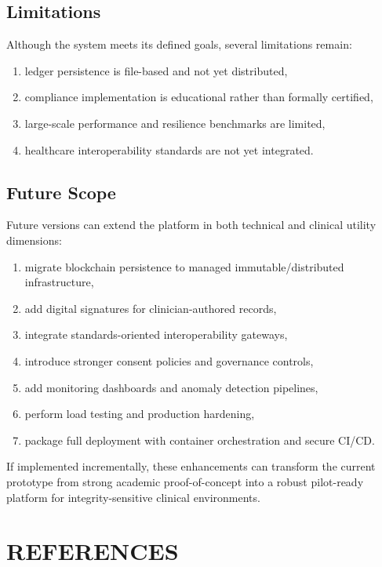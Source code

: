 \documentclass[12pt,a4paper]{report}
\begin{document}
\section{Limitations}

Although the system meets its defined goals, several limitations remain:

\begin{enumerate}
\item ledger persistence is file-based and not yet distributed,
\item compliance implementation is educational rather than formally certified,
\item large-scale performance and resilience benchmarks are limited,
\item healthcare interoperability standards are not yet integrated.
\end{enumerate}

\section{Future Scope}

Future versions can extend the platform in both technical and clinical utility dimensions:

\begin{enumerate}
\item migrate blockchain persistence to managed immutable/distributed infrastructure,
\item add digital signatures for clinician-authored records,
\item integrate standards-oriented interoperability gateways,
\item introduce stronger consent policies and governance controls,
\item add monitoring dashboards and anomaly detection pipelines,
\item perform load testing and production hardening,
\item package full deployment with container orchestration and secure CI/CD.
\end{enumerate}

If implemented incrementally, these enhancements can transform the current prototype from strong academic proof-of-concept into a robust pilot-ready platform for integrity-sensitive clinical environments.

\chapter*{REFERENCES}
\end{document}
